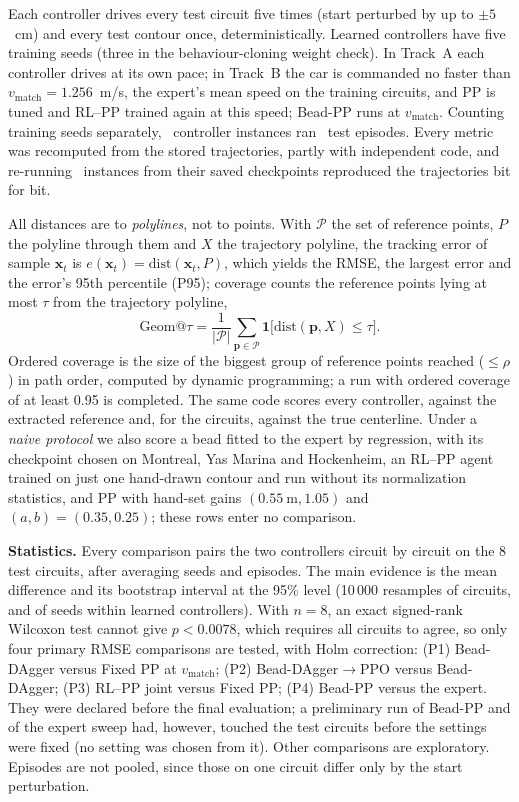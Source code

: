 \documentclass{IJCAS}
\begin{document}
Each controller drives every test circuit five times (start perturbed by up to $\pm5$~cm) and every test contour once, deterministically. Learned controllers have five training seeds (three in the behaviour-cloning weight check). In Track~A each controller drives at its own pace; in Track~B the car is commanded no faster than $v_{\mathrm{match}}=1.256$~m/s, the expert's mean speed on the training circuits, and PP is tuned and RL--PP trained again at this speed; Bead-PP runs at $v_{\mathrm{match}}$. Counting training seeds separately, \VnInst\ controller instances ran \VnEpisodes\ test episodes. Every metric was recomputed from the stored trajectories, partly with independent code, and re-running \VnRerun\ instances from their saved checkpoints reproduced the trajectories bit for bit.

All distances are to \emph{polylines}, not to points. With $\mathcal{P}$ the set of reference points, $P$ the polyline through them and $X$ the trajectory polyline, the tracking error of sample $\mathbf{x}_t$ is $e(\mathbf{x}_t)=\mathrm{dist}(\mathbf{x}_t,P)$, which yields the RMSE, the largest error and the error's 95th percentile (P95); coverage counts the reference points lying at most $\tau$ from the trajectory polyline,
\begin{equation}
\mathrm{Geom@}\tau=\frac{1}{|\mathcal{P}|}\sum_{\mathbf{p}\in\mathcal{P}}\mathbf{1}\big[\mathrm{dist}(\mathbf{p},X)\le\tau\big].\label{eq:geom}
\end{equation}
Ordered coverage is the size of the biggest group of reference points reached ($\le\rho$) in path order, computed by dynamic programming; a run with ordered coverage of at least 0.95 is completed. The same code scores every controller, against the extracted reference and, for the circuits, against the true centerline. Under a \emph{naive protocol} we also score a bead fitted to the expert by regression, with its checkpoint chosen on Montreal, Yas Marina and Hockenheim, an RL--PP agent trained on just one hand-drawn contour and run without its normalization statistics, and PP with hand-set gains $(0.55\ \mathrm{m},1.05)$ and $(a,b)=(0.35,0.25)$; these rows enter no comparison.

\textbf{Statistics.} Every comparison pairs the two controllers circuit by circuit on the 8 test circuits, after averaging seeds and episodes. The main evidence is the mean difference and its bootstrap interval at the 95\% level (10\,000 resamples of circuits, and of seeds within learned controllers). With $n=8$, an exact signed-rank Wilcoxon test cannot give $p<0.0078$, which requires all circuits to agree, so only four primary RMSE comparisons are tested, with Holm correction: (P1) Bead-DAgger versus Fixed PP at $v_{\mathrm{match}}$; (P2) Bead-DAgger$\to$PPO versus Bead-DAgger; (P3) RL--PP joint versus Fixed PP; (P4) Bead-PP versus the expert. They were declared before the final evaluation; a preliminary run of Bead-PP and of the expert sweep had, however, touched the test circuits before the settings were fixed (no setting was chosen from it). Other comparisons are exploratory. Episodes are not pooled, since those on one circuit differ only by the start perturbation.
\end{document}
